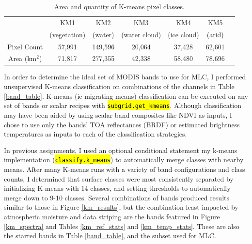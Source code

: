 \documentclass[12pt]{article}
\newcommand{\hltexttt}[1]{\texttt{\hl{#1}}}
\begin{document}
\begin{table}[h!]
    \centering
    \begin{tabular}{c|cccccc}
        & KM1 & KM2 & KM3 & KM4 & KM5 \\
        & \footnotesize{(vegetation)} & \footnotesize{(water)} & \footnotesize{(water cloud)} & \footnotesize{(ice cloud)}& \footnotesize{(arid)} \\
        \hline
        Pixel Count & 57,991 & 149,596 & 20,064 & 37,428 & 62,601 \\
        Area (km$^2$) & 71,817 & 277,355 & 42,338 & 58,480 & 78,696 \\
    \end{tabular}
    \caption{Area and quantity of K-means pixel classes.}
    \label{km_areas}
\end{table}

In order to determine the ideal set of MODIS bands to use for MLC, I performed unsupervised K-means classification on combinations of the channels in Table \ref{band_table}. K-means (ie migrating means) classification can be executed on any set of bands or scalar recipes with \hltexttt{subgrid.get\_kmeans}. Although classification may have been aided by using scalar band composites like NDVI as inputs, I chose to use only the bands' TOA reflectances (BRDF) or estimated brightness temperatures as inputs to each of the classification strategies.

In previous assignments, I used an optional conditional statement my k-means implementation (\hltexttt{classify.k\_means}) to automatically merge classes with nearby means. After many K-means runs with a variety of band configurations and class counts, I determined that surface classes were most consistently separated by initializing K-means with 14 classes, and setting thresholds to automatically merge down to 9-10 classes. Several combinations of bands produced results similar to those in Figure \ref{km_results}, but the combination least impacted by atmospheric moisture and data striping are the bands featured in Figure \ref{km_spectra} and Tables \ref{km_ref_stats} and \ref{km_temp_stats}. These are also the starred bands in Table \ref{band_table}, and the subset used for MLC.

\clearpage
\end{document}
